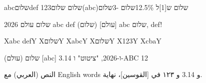\documentclass{article}
\begin{document}
abcשלוםdef 123שלום שלום(abc)שלום ש[1]ל 12.5\%שלום -3שלום

שלום עולם 2026 abc def (שלום) [עולם] abc שלום, def!

X‫abc def‬Y X‎שלום‎Y X⁧abc⁩Y X⁦שלום⁩Y X⁨123⁩Y X‮abc‬Y

\begin{hebrew}
שלום (עולם) [abc] 3.14 ו-2026, "ציטוט" ו-ABC 12%
\end{hebrew}

\begin{Arabic}
النص (العربي) مع English words و 3.14 و ١٢٣ في [القوسين]، نهاية.
\end{Arabic}
\end{document}
